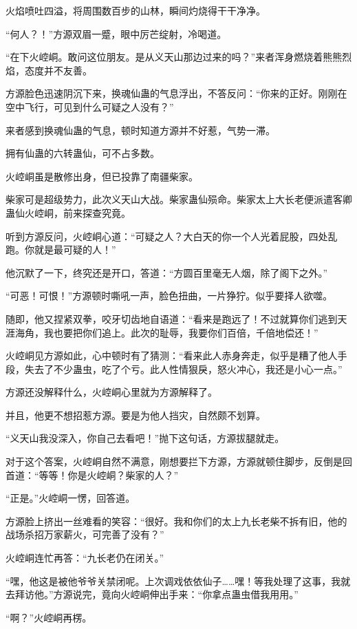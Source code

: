 \begin{this_body}
火焰喷吐四溢，将周围数百步的山林，瞬间灼烧得干干净净。

“何人？！”方源双眉一蹙，眼中厉芒绽射，冷喝道。

“在下火崆峒。敢问这位朋友。是从义天山那边过来的吗？”来者浑身燃烧着熊熊烈焰，态度并不友善。

方源脸色迅速阴沉下来，换魂仙蛊的气息浮出，不答反问：“你来的正好。刚刚在空中飞行，可见到什么可疑之人没有？”

来者感到换魂仙蛊的气息，顿时知道方源并不好惹，气势一滞。

拥有仙蛊的六转蛊仙，可不占多数。

火崆峒虽是散修出身，但已投靠了南疆柴家。

柴家可是超级势力，此次义天山大战。柴家蛊仙殒命。柴家太上大长老便派遣客卿蛊仙火崆峒，前来探查究竟。

听到方源反问，火崆峒心道：“可疑之人？大白天的你一个人光着屁股，四处乱跑。你就是最可疑的人！”

他沉默了一下，终究还是开口，答道：“方圆百里毫无人烟，除了阁下之外。”

“可恶！可恨！”方源顿时嘶吼一声，脸色扭曲，一片狰狞。似乎要择人欲噬。

随即，他又捏紧双拳，咬牙切齿地自语道：“看来是跑远了！不过就算你们逃到天涯海角，我也要把你们追上。此次的耻辱，我要你们百倍，千倍地偿还！”

火崆峒见方源如此，心中顿时有了猜测：“看来此人赤身奔走，似乎是糟了他人手段，失去了不少蛊虫，吃了个亏。此人性情狠戾，怒火冲心，我还是小心一点。”

方源还没解释什么，火崆峒心里就为方源解释了。

并且，他更不想招惹方源。要是为他人挡灾，自然颇不划算。

“义天山我没深入，你自己去看吧！”抛下这句话，方源拔腿就走。

对于这个答案，火崆峒自然不满意，刚想要拦下方源，方源就顿住脚步，反倒是回首道：“等等！你是火崆峒？柴家的人？”

“正是。”火崆峒一愣，回答道。

方源脸上挤出一丝难看的笑容：“很好。我和你们的太上九长老柴不拆有旧，他的战场杀招万家薪火，可完善了没有？”

火崆峒连忙再答：“九长老仍在闭关。”

“嘿，他这是被他爷爷关禁闭呢。上次调戏依依仙子……嘿！等我处理了这事，我就去拜访他。”方源说完，竟向火崆峒伸出手来：“你拿点蛊虫借我用用。”

“啊？”火崆峒再楞。


\end{this_body}
